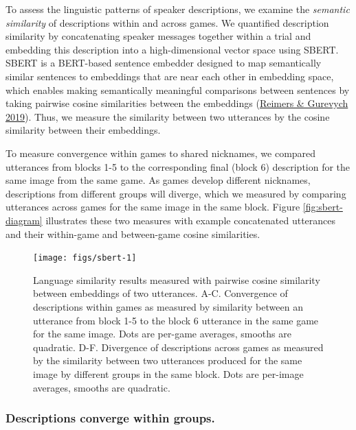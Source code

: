 \documentclass[
  english,
  a4paper,
]{article}
\begin{document}
To assess the linguistic patterns of speaker descriptions, we examine the \emph{semantic similarity} of descriptions within and across games.
We quantified description similarity by concatenating speaker messages together within a trial and embedding this description into a high-dimensional vector space using SBERT.
SBERT is a BERT-based sentence embedder designed to map semantically similar sentences to embeddings that are near each other in embedding space, which enables making semantically meaningful comparisons between sentences by taking pairwise cosine similarities between the embeddings (\protect\hyperlink{ref-reimers2019}{Reimers \& Gurevych 2019}).
Thus, we measure the similarity between two utterances by the cosine similarity between their embeddings.

To measure convergence within games to shared nicknames, we compared utterances from blocks 1-5 to the corresponding final (block 6) description for the same image from the same game.
As games develop different nicknames, descriptions from different groups will diverge, which we measured by comparing utterances across games for the same image in the same block.
Figure \ref{fig:sbert-diagram} illustrates these two measures with example concatenated utterances and their within-game and between-game cosine similarities.

\begin{figure}[t!]

{\centering \texttt{[image: figs/sbert-1]} 

}

\caption{Language similarity results measured with pairwise cosine similarity between embeddings of two utterances. A-C. Convergence of descriptions within games as measured by similarity between an utterance from block 1-5 to the block 6 utterance in the same game for the same image. Dots are per-game averages, smooths are quadratic. D-F. Divergence of descriptions across games as measured by the similarity between two utterances produced for the same image by different groups in the same block. Dots are per-image averages, smooths are quadratic.}\label{fig:sbert}
\end{figure}

\hypertarget{descriptions-converge-within-groups.}{%
\subsubsection{Descriptions converge within groups.}\label{descriptions-converge-within-groups.}}
\end{document}
